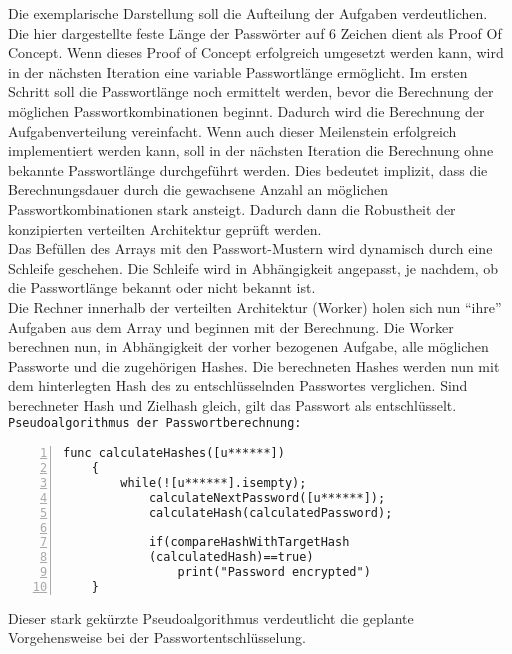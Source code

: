 Die exemplarische Darstellung soll die Aufteilung der Aufgaben verdeutlichen. Die hier dargestellte feste Länge der Passwörter auf 6 Zeichen dient als Proof Of Concept. Wenn dieses Proof of Concept erfolgreich umgesetzt werden kann, wird in der nächsten Iteration eine variable Passwortlänge ermöglicht. Im ersten Schritt soll die Passwortlänge noch ermittelt werden, bevor die Berechnung der möglichen Passwortkombinationen beginnt. Dadurch wird die Berechnung der Aufgabenverteilung vereinfacht. Wenn auch dieser Meilenstein erfolgreich implementiert werden kann, soll in der nächsten Iteration die Berechnung ohne bekannte Passwortlänge durchgeführt werden. Dies bedeutet implizit, dass die Berechnungsdauer durch die gewachsene Anzahl an möglichen Passwortkombinationen stark ansteigt. Dadurch dann die Robustheit der konzipierten verteilten Architektur geprüft werden. \\

Das Befüllen des Arrays mit den Passwort-Mustern wird dynamisch durch eine Schleife geschehen. Die Schleife wird in Abhängigkeit angepasst, je nachdem, ob die Passwortlänge bekannt oder nicht bekannt ist. \\
Die Rechner innerhalb der verteilten Architektur (Worker) holen sich nun \enquote{ihre} Aufgaben aus dem Array und beginnen mit der Berechnung. Die Worker berechnen nun, in Abhängigkeit der vorher bezogenen Aufgabe, alle möglichen Passworte und die zugehörigen Hashes. Die berechneten Hashes werden nun mit dem hinterlegten Hash des zu entschlüsselnden Passwortes verglichen. Sind berechneter Hash und Zielhash gleich, gilt das Passwort als entschlüsselt. \\

\texttt{Pseudoalgorithmus der Passwortberechnung:}
\begin{lstlisting}[basicstyle=\ttfamily,numbers=left,numberstyle=\footnotesize\ttfamily,backgroundcolor=\color{sourcegray}]
	func calculateHashes([u******])
	{
		while(![u******].isempty);
			calculateNextPassword([u******]);
			calculateHash(calculatedPassword);
						
			if(compareHashWithTargetHash
			(calculatedHash)==true)
				print("Password encrypted")
	}
\end{lstlisting}

Dieser stark gekürzte Pseudoalgorithmus verdeutlicht die geplante Vorgehensweise bei der Passwortentschlüsselung. \\

